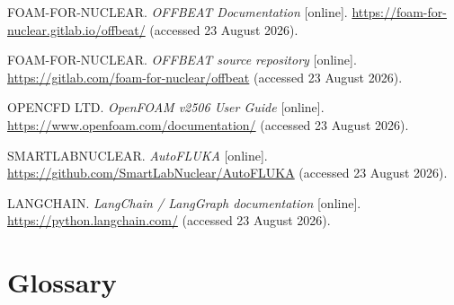 \begin{list}{}{\setlength{\leftmargin}{1cm}\setlength{\itemindent}{-1cm}}

\item
FOAM-FOR-NUCLEAR. \textit{OFFBEAT Documentation} [online].
\url{https://foam-for-nuclear.gitlab.io/offbeat/}
(accessed 23 August 2026).

\item
FOAM-FOR-NUCLEAR. \textit{OFFBEAT source repository} [online].
\url{https://gitlab.com/foam-for-nuclear/offbeat}
(accessed 23 August 2026).

\item
OPENCFD LTD. \textit{OpenFOAM v2506 User Guide} [online].
\url{https://www.openfoam.com/documentation/}
(accessed 23 August 2026).

\item
SMARTLABNUCLEAR. \textit{AutoFLUKA} [online].
\url{https://github.com/SmartLabNuclear/AutoFLUKA}
(accessed 23 August 2026).

\item
LANGCHAIN. \textit{LangChain / LangGraph documentation} [online].
\url{https://python.langchain.com/}
(accessed 23 August 2026).

\end{list}


\clearpage

\chapter*{Glossary}

\vspace{0.4cm}

